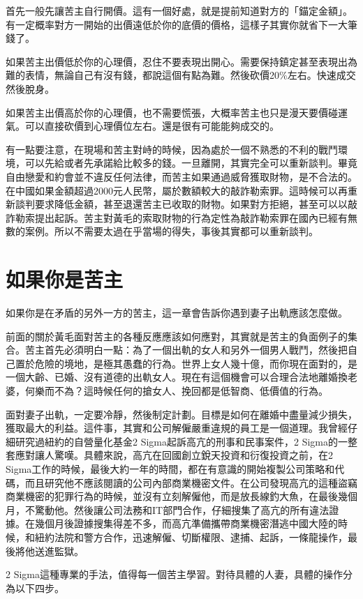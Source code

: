 首先一般先讓苦主自行開價。這有一個好處，就是提前知道對方的「錨定金額」。有一定概率對方一開始的出價遠低於你的底價的價格，這樣子其實你就省下一大筆錢了。

如果苦主出價低於你的心理價，忍住不要表現出開心。需要保持鎮定甚至表現出為難的表情，無論自己有沒有錢，都說這個有點為難。然後砍價20\%左右。快速成交然後脫身。

如果苦主出價高於你的心理價，也不需要慌張，大概率苦主也只是漫天要價碰運氣。可以直接砍價到心理價位左右。還是很有可能能夠成交的。

有一點要注意，在現場和苦主對峙的時候，因為處於一個不熟悉的不利的戰鬥環境，可以先給或者先承諾給比較多的錢。一旦離開，其實完全可以重新談判。畢竟自由戀愛和約會並不違反任何法律，而苦主如果通過威脅獲取財物，是不合法的。在中國如果金額超過2000元人民幣，屬於數額較大的敲詐勒索罪。這時候可以再重新談判要求降低金額，甚至退還苦主已收取的財物。如果對方拒絕，甚至可以以敲詐勒索提出起訴。苦主對黃毛的索取財物的行為定性為敲詐勒索罪在國內已經有無數的案例。所以不需要太過在乎當場的得失，事後其實都可以重新談判。

\section{如果你是苦主}

如果你是在矛盾的另外一方的苦主，這一章會告訴你遇到妻子出軌應該怎麼做。

前面的關於黃毛面對苦主的各種反應應該如何應對，其實就是苦主的負面例子的集合。苦主首先必須明白一點：為了一個出軌的女人和另外一個男人戰鬥，然後把自己置於危險的境地，是極其愚蠢的行為。世界上女人幾十億，而你現在面對的，是一個大齡、已婚、沒有道德的出軌女人。現在有這個機會可以合理合法地離婚換老婆，何樂而不為？這時候任何的搶女人、挽回都是低智商、低價值的行為。

面對妻子出軌，一定要冷靜，然後制定計劃。目標是如何在離婚中盡量減少損失，獲取最大的利益。這件事，其實和公司解僱嚴重違規的員工是一個道理。我曾經仔細研究過紐約的自營量化基金2 Sigma起訴高亢的刑事和民事案件，2 Sigma的一整套應對讓人驚嘆。具體來說，高亢在回國創立銳天投資和衍復投資之前，在2 Sigma工作的時候，最後大約一年的時間，都在有意識的開始複製公司策略和代碼，而且研究他不應該閱讀的公司內部商業機密文件。在公司發現高亢的這種盜竊商業機密的犯罪行為的時候，並沒有立刻解僱他，而是放長線釣大魚，在最後幾個月，不驚動他。然後讓公司法務和IT部門合作，仔細搜集了高亢的所有違法證據。在幾個月後證據搜集得差不多，而高亢準備攜帶商業機密潛逃中國大陸的時候，和紐約法院和警方合作，迅速解僱、切斷權限、逮捕、起訴，一條龍操作，最後將他送進監獄。

2 Sigma這種專業的手法，值得每一個苦主學習。對待具體的人妻，具體的操作分為以下四步。

